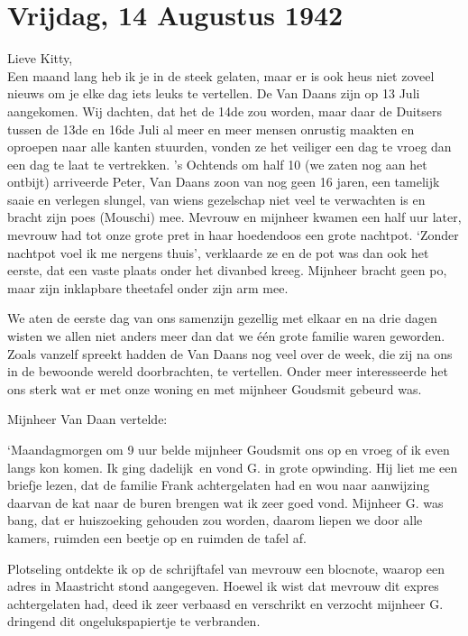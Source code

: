 \documentclass{book}
\begin{document}
\section*{Vrijdag, 14 Augustus 1942}

Lieve Kitty,\\
Een maand lang heb ik je in de steek gelaten, maar er is ook heus
niet zoveel nieuws om je elke dag iets leuks te vertellen. De Van Daans zijn op
13 Juli aangekomen. Wij dachten, dat het de 14de zou worden, maar daar de
Duitsers tussen de 13de en 16de Juli al meer en meer mensen onrustig maakten en
oproepen naar alle kanten stuurden, vonden ze het veiliger een dag te vroeg dan
een dag te laat te vertrekken. 's Ochtends om half 10 (we zaten nog aan het
ontbijt) arriveerde Peter, Van Daans zoon van nog geen 16 jaren, een tamelijk
saaie en verlegen slungel, van wiens gezelschap niet veel te verwachten is en
bracht zijn poes (Mouschi) mee.  Mevrouw en mijnheer kwamen een half uur later,
mevrouw had tot onze grote pret in haar hoedendoos een grote nachtpot. `Zonder
nachtpot voel ik me nergens thuis', verklaarde ze en de pot was dan ook het
eerste, dat een vaste plaats onder het divanbed kreeg. Mijnheer bracht geen po,
maar zijn inklapbare theetafel onder zijn arm mee.

We aten de eerste dag van ons samenzijn gezellig met elkaar en na drie dagen
wisten we allen niet anders meer dan dat we één grote familie waren geworden.
Zoals vanzelf spreekt hadden de Van Daans nog veel over de week, die zij na ons
in de bewoonde wereld doorbrachten, te vertellen. Onder meer interesseerde het
ons sterk wat er met onze woning en met mijnheer Goudsmit gebeurd was.

Mijnheer Van Daan vertelde:

`Maandagmorgen om 9 uur belde mijnheer Goudsmit ons op en vroeg of ik even langs
kon komen. Ik ging dadelijk~en vond G. in grote opwinding.  Hij liet me een
briefje lezen, dat de familie Frank achtergelaten had en wou naar aanwijzing
daarvan de kat naar de buren brengen wat ik zeer goed vond. Mijnheer G. was
bang, dat er huiszoeking gehouden zou worden, daarom liepen we door alle kamers,
ruimden een beetje op en ruimden de tafel af.

Plotseling ontdekte ik op de schrijftafel van mevrouw een blocnote, waarop een
adres in Maastricht stond aangegeven. Hoewel ik wist dat mevrouw dit expres
achtergelaten had, deed ik zeer verbaasd en verschrikt en verzocht mijnheer G.
dringend dit ongelukspapiertje te verbranden.
\end{document}
